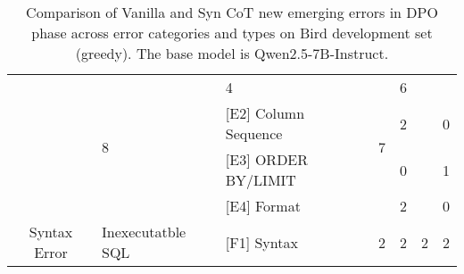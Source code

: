 \begin{table*}[t]
\begin{adjustbox}{max width=\textwidth}
\begin{tabular}{c p{3.5cm} l | c | c | c | c }
    & \multirow{4}{*}{8}
    & 4 
    & \multirow{4}{*}{7}
    & 6 
    \\
    & & [E2] Column Sequence &
    & 2 &
    & 0
    \\
    & & [E3] ORDER BY/LIMIT &
    & 0 &
    & 1 
    \\
    & & [E4] Format &
    & 2 &
    & 0
    \\
\midrule
Syntax Error 
    & Inexecutatble SQL
    & [F1] Syntax 
    & 2
    & 2
    & 2
    & 2
    \\
\bottomrule
\end{tabular}
\end{adjustbox}
\caption{Comparison of Vanilla and Syn CoT new emerging errors in DPO phase across error categories and types on Bird development set (greedy). The base model is Qwen2.5-7B-Instruct.}
\label{tab:newErrorStat}
\end{table*}